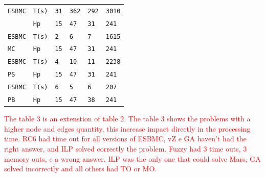 \begin{table}[h]
\begin{tabular}[c]{m{1.3cm}m{1.20cm}|m{0.85cm}|m{0.85cm}|m{0.85cm}|m{0.85cm}}
\rowcolor{Gray}
\verb|ESBMC| & \verb|T(s)| & \verb|31| & \verb|362| & \verb|292| & \verb|3010|\\
\rowcolor{Gray}
\verb|| & \verb|Hp| & \verb|15| & \verb|47| & \verb|31| & \verb|241|\\
\hline

\verb|ESBMC| & \verb|T(s)| & \verb|2| & \verb|6| & \verb|7| & \verb|1615|\\
\verb|MC| & \verb|Hp| & \verb|15| & \verb|47| & \verb|31| & \verb|241|\\
\hline

\rowcolor{Gray}
\verb|ESBMC| & \verb|T(s)| & \verb|4| & \verb|10| & \verb|11| & \verb|2238|\\
\rowcolor{Gray}
\verb|PS| & \verb|Hp| & \verb|15| & \verb|47| & \verb|31| & \verb|241|\\
\hline

\verb|ESBMC| & \verb|T(s)| & \verb|6| & \verb|5| & \verb|6| & \verb|207|\\
\verb|PB| & \verb|Hp| & \verb|15| & \verb|47| & \verb|38| & \verb|241|\\
\bottomrule[1.5pt]

\end{tabular}
\end{table}

\textcolor{Red}{The table 3 is an extenstion of table 2. The table 3 shows the problems with a higher node and edges quantity, this increase impact directly in the processing time. RC6 had time out for all versions of ESBMC, vZ e GA haven't had the right answer, and ILP solved correctly the problem. Fuzzy had 3 time outs, 3 memory outs, e a wrong answer. ILP was the only one that could solve Mars, GA solved incorrectly and all others had TO or MO.} 

